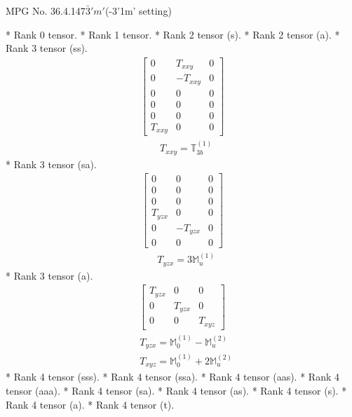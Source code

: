 \documentclass[fleqn,8pt,landscape]{jsarticle}
\begin{document}
\setcounter{MaxMatrixCols}{32}

\renewcommand{\tablename}{Table~}
\renewcommand{\figurename}{Figure~}
\begin{center}
\LARGE
MPG No. 36.4.147\quad$\bar{3}'m'$\quad(-3'1m' setting)
\end{center}
* Rank 0 tensor.
* Rank 1 tensor.
* Rank 2 tensor (s).
* Rank 2 tensor (a).
* Rank 3 tensor (ss).
\begin{align*}
\begin{bmatrix} 0 & T_{xxy} & 0 \\ 0 & - T_{xxy} & 0 \\ 0 & 0 & 0 \\ 0 & 0 & 0 \\ 0 & 0 & 0 \\ T_{xxy} & 0 & 0 \end{bmatrix}
\end{align*}
\begin{align*}
& T_{xxy} = \mathbb{T}_{3b}^{(1)}
\end{align*}
* Rank 3 tensor (sa).
\begin{align*}
\begin{bmatrix} 0 & 0 & 0 \\ 0 & 0 & 0 \\ 0 & 0 & 0 \\ T_{yzx} & 0 & 0 \\ 0 & - T_{yzx} & 0 \\ 0 & 0 & 0 \end{bmatrix}
\end{align*}
\begin{align*}
& T_{yzx} = 3 \mathbb{M}_{u}^{(1)}
\end{align*}
* Rank 3 tensor (a).
\begin{align*}
\begin{bmatrix} T_{yzx} & 0 & 0 \\ 0 & T_{yzx} & 0 \\ 0 & 0 & T_{xyz} \end{bmatrix}
\end{align*}
\begin{align*}
& T_{yzx} = \mathbb{M}_{0}^{(1)} - \mathbb{M}_{u}^{(2)} \\
& T_{xyz} = \mathbb{M}_{0}^{(1)} + 2 \mathbb{M}_{u}^{(2)}
\end{align*}
* Rank 4 tensor (sss).
* Rank 4 tensor (ssa).
* Rank 4 tensor (aas).
* Rank 4 tensor (aaa).
* Rank 4 tensor (sa).
* Rank 4 tensor (as).
* Rank 4 tensor (s).
* Rank 4 tensor (a).
* Rank 4 tensor (t).
\end{document}
